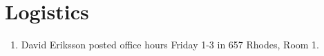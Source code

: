 \section{Logistics}

\begin{enumerate}
\item David Eriksson posted office hours Friday 1-3 in 657 Rhodes, Room 1.
\end{enumerate}
